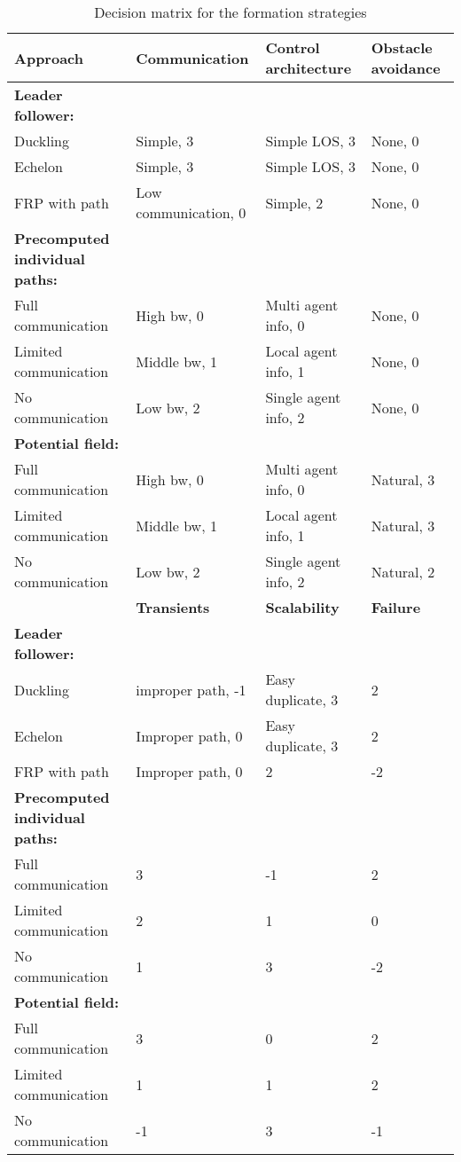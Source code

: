 \begin{sidewaystable}
\begin{tabular}{l|lll}
\toprule
\textbf{Approach} & \textbf{Communication} & \textbf{Control architecture} & \textbf{Obstacle avoidance} \\
\hline
\textbf{Leader follower:}&&&\\
Duckling & Simple, 3 & Simple LOS, 3 & None, 0 \\
Echelon & Simple, 3 & Simple LOS, 3 & None, 0 \\
\ac{FRP} with path& Low communication, 0 & Simple, 2 & None, 0 \\
\textbf{Precomputed individual paths:}&&&\\
Full communication& High bw, 0 & Multi agent info, 0 & None, 0 \\
Limited communication& Middle bw, 1 & Local agent info, 1 & None, 0 \\
No communication& Low bw, 2 & Single agent info, 2 & None, 0 \\
\textbf{Potential field:}&&&\\
Full communication& High bw, 0 & Multi agent info, 0 & Natural, 3 \\
Limited communication& Middle bw, 1 & Local agent info, 1 & Natural, 3 \\
No communication& Low bw, 2 & Single agent info, 2 & Natural, 2\\
\bottomrule
 & \textbf{Transients} & \textbf{Scalability} & \textbf{Failure}\\
\hline
\textbf{Leader follower:}&&&\\
Duckling  & improper path, -1 & Easy duplicate, 3 & 2 \\
Echelon  & Improper path, 0 & Easy duplicate, 3 & 2 \\
\ac{FRP} with path   & Improper path, 0 & 2 & -2 \\
\textbf{Precomputed individual paths:}&&&\\
Full communication   & 3 & -1 & 2 \\
Limited communication  & 2 & 1 & 0 \\
No communication   & 1 & 3 & -2 \\
\textbf{Potential field:}&&&\\
Full communication  & 3 & 0 & 2 \\
Limited communication  & 1 & 1 & 2 \\
No communication  & -1 & 3 & -1 \\
\end{tabular}
\caption{Decision matrix for the formation strategies}
\label{tab:decision-matrix}
\end{sidewaystable}

